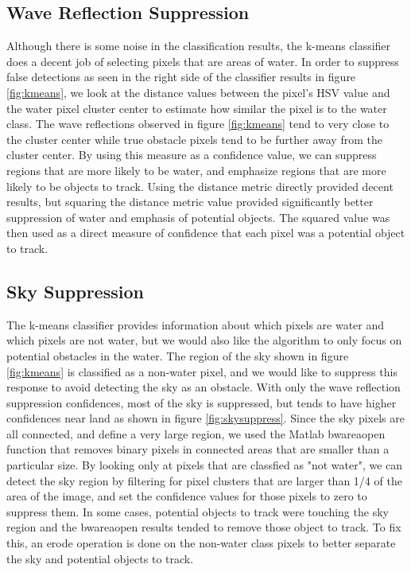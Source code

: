 \documentclass{article}
\begin{document}
\subsection{Wave Reflection Suppression}
Although there is some noise in the classification results, the k-means classifier does a decent job of selecting pixels that are areas of water. In order to suppress false detections as seen in the right side of the classifier results in figure \ref{fig:kmeans}, we look at the distance values between the pixel's HSV value and the water pixel cluster center to estimate how similar the pixel is to the water class.  The wave reflections observed in figure \ref{fig:kmeans} tend to very close to the cluster center while true obstacle pixels tend to be further away from the cluster center.  By using this measure as a confidence value, we can suppress regions that are more likely to be water, and emphasize regions that are more likely to be objects to track.  Using the distance metric directly provided decent results, but squaring the distance metric value provided significantly better suppression of water and emphasis of potential objects.  The squared value was then used as a direct measure of confidence that each pixel was a potential object to track.

\subsection{Sky Suppression}
The k-means classifier provides information about which pixels are water and which pixels are not water, but we would also like the algorithm to only focus on potential obstacles in the water.  The region of the sky shown in figure \ref{fig:kmeans} is classified as a non-water pixel, and we would like to suppress this response to avoid detecting the sky as an obstacle. With only the wave reflection suppression confidences, most of the sky is suppressed, but tends to have higher confidences near land as shown in figure \ref{fig:skysuppress}.  Since the sky pixels are all connected, and define a very large region, we used the Matlab bwareaopen function that removes binary pixels in connected areas that are smaller than a particular size.  By looking only at pixels that are classfied as "not water", we can detect the sky region by filtering for pixel clusters that are larger than 1/4 of the area of the image, and set the confidence values for those pixels to zero to suppress them. In some cases, potential objects to track were touching the sky region and the bwareaopen results tended to remove those object to track.  To fix this, an erode operation is done on the non-water class pixels to better separate the sky and potential objects to track.
 
\end{document}
